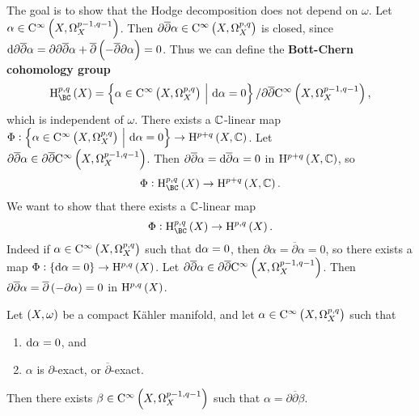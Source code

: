 The goal is to show that the Hodge decomposition does not depend on $ \omega $. Let $ \alpha \in \C^\infty\br{X, \Omega_X^{p - 1, q - 1}} $. Then $ \partial\overline{\partial}\alpha \in \C^\infty\br{X, \Omega_X^{p, q}} $ is closed, since $ \d\partial\overline{\partial}\alpha = \partial\partial\overline{\partial}\alpha + \overline{\partial}\br{-\overline{\partial}\partial\alpha} = 0 $. Thus we can define the \textbf{Bott-Chern cohomology group}
$$ \H_{\BC}^{p, q}\br{X} = \cbr{\alpha \in \C^\infty\br{X, \Omega_X^{p, q}} \st \d\alpha = 0} / \partial\overline{\partial}\C^\infty\br{X, \Omega_X^{p - 1, q - 1}}, $$
which is independent of $ \omega $. There exists a $ \mathbb{C} $-linear map $ \Phi : \cbr{\alpha \in \C^\infty\br{X, \Omega_X^{p, q}} \st \d\alpha = 0} \to \H^{p + q}\br{X, \CC} $. Let $ \partial\overline{\partial}\alpha \in \partial\overline{\partial}\C^\infty\br{X, \Omega_X^{p - 1, q - 1}} $. Then $ \partial\overline{\partial}\alpha = \mathrm{d}\overline{\partial}\alpha = 0 $ in $ \H^{p + q}\br{X, \CC} $, so
$$ \Phi : \H_{\BC}^{p, q}\br{X} \to \H^{p + q}\br{X, \CC}. $$
We want to show that there exists a $ \mathbb{C} $-linear map
$$ \Phi : \H_{\BC}^{p, q}\br{X} \to \H^{p, q}\br{X}. $$
Indeed if $ \alpha \in \C^\infty\br{X, \Omega_X^{p, q}} $ such that $ \mathrm{d}\alpha = 0 $, then $ \partial\alpha = \overline{\partial}\alpha = 0 $, so there exists a map $ \Phi : \cbr{\d\alpha = 0} \to \H^{p, q}\br{X} $. Let $ \partial\overline{\partial}\alpha \in \partial\overline{\partial}\C^\infty\br{X, \Omega_X^{p - 1, q - 1}} $. Then $ \partial\overline{\partial}\alpha = \overline{\partial}\br{-\partial\alpha} = 0 $ in $ \H^{p, q}\br{X} $.

\pagebreak

\begin{lemma}
Let $ \br{X, \omega} $ be a compact K\"ahler manifold, and let $ \alpha \in \C^\infty\br{X, \Omega_X^{p, q}} $ such that
\begin{enumerate}
\item $ \mathrm{d}\alpha = 0 $, and
\item $ \alpha $ is $ \partial $-exact, or $ \overline{\partial} $-exact.
\end{enumerate}
Then there exists $ \beta \in \C^\infty\br{X, \Omega_X^{p - 1, q - 1}} $ such that $ \alpha = \partial\overline{\partial}\beta $.
\end{lemma}

